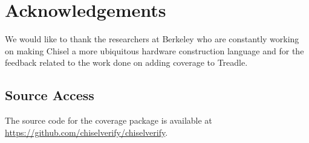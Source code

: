\documentclass[a4paper]{IEEEtran}
\newcommand{\todo}[1]{{\color{olive} TODO: #1}}
\newcommand{\martin}[1]{{\color{blue} Martin: #1}}
\newcommand{\hjd}[1]{{\color{pink} Hans: #1}}
\begin{document}
\section*{Acknowledgements}
We would like to thank the researchers at Berkeley who are constantly working on making Chisel a more ubiquitous hardware construction language and for the feedback related to the work done on adding coverage to Treadle.

\subsection*{Source Access}
The source code for the coverage package is available at\\ \url{https://github.com/chiselverify/chiselverify}.



\end{document}
